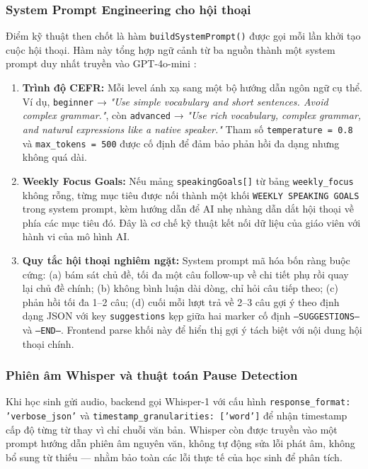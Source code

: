 \subsubsection{System Prompt Engineering cho hội thoại}

Điểm kỹ thuật then chốt là hàm \texttt{buildSystemPrompt()} được gọi mỗi lần khởi tạo cuộc hội thoại. Hàm này tổng hợp ngữ cảnh từ ba nguồn thành một system prompt duy nhất truyền vào GPT-4o-mini \cite{openai_gpt4o}:

\begin{enumerate}
    \item \textbf{Trình độ CEFR:} Mỗi level ánh xạ sang một bộ hướng dẫn ngôn ngữ cụ thể. Ví dụ, \texttt{beginner} → \textit{"Use simple vocabulary and short sentences. Avoid complex grammar."}, còn \texttt{advanced} → \textit{"Use rich vocabulary, complex grammar, and natural expressions like a native speaker."} Tham số \texttt{temperature = 0.8} và \texttt{max\_tokens = 500} được cố định để đảm bảo phản hồi đa dạng nhưng không quá dài.

    \item \textbf{Weekly Focus Goals:} Nếu mảng \texttt{speakingGoals[]} từ bảng \texttt{weekly\_focus} không rỗng, từng mục tiêu được nối thành một khối \texttt{WEEKLY SPEAKING GOALS} trong system prompt, kèm hướng dẫn để AI nhẹ nhàng dẫn dắt hội thoại về phía các mục tiêu đó. Đây là cơ chế kỹ thuật kết nối dữ liệu của giáo viên với hành vi của mô hình AI.

    \item \textbf{Quy tắc hội thoại nghiêm ngặt:} System prompt mã hóa bốn ràng buộc cứng: (a) bám sát chủ đề, tối đa một câu follow-up về chi tiết phụ rồi quay lại chủ đề chính; (b) không bình luận dài dòng, chỉ hỏi câu tiếp theo; (c) phản hồi tối đa 1--2 câu; (d) cuối mỗi lượt trả về 2--3 câu gợi ý theo định dạng JSON với key \texttt{suggestions} kẹp giữa hai marker cố định \texttt{---SUGGESTIONS---} và \texttt{---END---}. Frontend parse khối này để hiển thị gợi ý tách biệt với nội dung hội thoại chính.
\end{enumerate}

\subsubsection{Phiên âm Whisper và thuật toán Pause Detection}

Khi học sinh gửi audio, backend gọi Whisper-1 \cite{openai_whisper} với cấu hình \texttt{response\_format: 'verbose\_json'} và \texttt{timestamp\_granularities: ['word']} để nhận timestamp cấp độ từng từ thay vì chỉ chuỗi văn bản. Whisper còn được truyền vào một prompt hướng dẫn phiên âm nguyên văn, không tự động sửa lỗi phát âm, không bổ sung từ thiếu — nhằm bảo toàn các lỗi thực tế của học sinh để phân tích.

